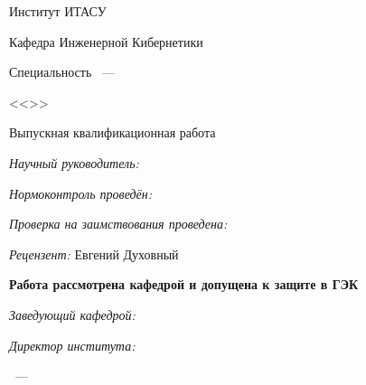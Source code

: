 \thispagestyle{empty}%
\begin{center}%
\MakeUppercase{\thesisOrganization}
\end{center}%
%

\vspace{0pt plus1fill} %
\begin{center}%

Институт ИТАСУ

Кафедра Инженерной Кибернетики

\begin{center}%

\vspace{0pt plus3fill}

\end{center}
{\large \thesisAuthor}
\end{center}%
%
\vspace{0pt plus1fill} %
\begin{center}%
\textbf {\large \thesisTitle}

\vspace{0pt plus2fill} %
{%
Специальность \thesisSpecialtyNumber~---

<<\thesisSpecialtyTitle>>
}

\vspace{0pt plus2fill} %
Выпускная квалификационная работа \thesisDegree
\end{center}%
%
\vspace{0pt plus2fill} %
\begin{flushleft}%
\linespread{2}\selectfont\emph{Научный руководитель:} 
\supervisorRegalia~  
\supervisorFio

\linespread{2}\selectfont\emph{Нормоконтроль проведён:}\hrulefill

\linespread{2}\selectfont\emph{Проверка на заимствования проведена:}\hrulefill

\linespread{2}\selectfont\emph{Рецензент:} Евгений Духовный

\linespread{2}\selectfont\textbf{Работа рассмотрена кафедрой и допущена к защите в ГЭК}

\linespread{2}\selectfont\emph{Заведующий кафедрой:}\hrulefill

\linespread{2}\selectfont\emph{Директор института:}\hrulefill

\end{flushleft}%
%

\vspace{0pt plus4fill} %


\begin{center}%
{\thesisCity~--- \thesisYear}
\end{center}%
\newpage
